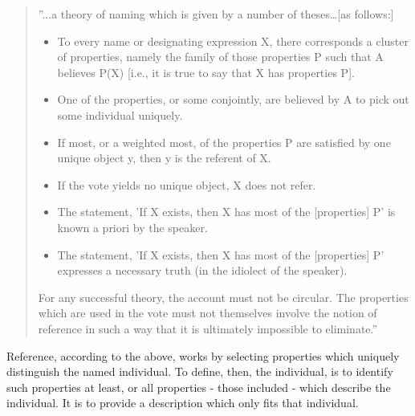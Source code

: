 \documentclass[graybox,envcountchap,sectrefs]{svmono}
\begin{document}
\begin{quote}
''...a theory of naming which is given by a number of theses…[as follows:]
\begin{itemize}
\item To every name or designating expression X, there corresponds a cluster of properties, namely the family of those properties P such that A believes P(X) [i.e., it is true to say that X has properties P].
\item One of the properties, or some conjointly, are believed by A to pick out some individual uniquely.
\item If most, or a weighted most, of the properties P are satisfied by one unique object y, then y is the referent of X.
\item If the vote yields no unique object, X does not refer.
\item The statement, 'If X exists, then X has most of the [properties] P' is known a priori by the speaker.
\item The statement, 'If X exists, then X has most of the [properties] P' expresses a necessary truth (in the idiolect of the speaker).
\end{itemize}
For any successful theory, the account must not be circular. The properties which are used in the vote must not themselves involve the notion of reference in such a way that it is ultimately impossible to eliminate.'' \cite{kripke1972naming}
\end{quote}

Reference, according to the above, works by selecting properties which uniquely distinguish the named individual. To define, then, the individual, is to identify such properties at least, or all properties - those included - which describe the individual. It is to provide a description which only fits that individual.
\end{document}
